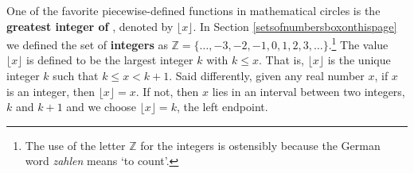 One of the favorite piecewise-defined functions in mathematical circles is the  \textbf{greatest integer of }, denoted by $\lfloor x \rfloor$. In Section \ref{setsofnumbersboxonthispage} we defined the set of \textbf{integers} as  $\mathbb{Z} = \{ \ldots, -3, -2, -1, 0, 1, 2, 3, \ldots\}$.\footnote{The use of the letter $\mathbb{Z}$ for the integers is ostensibly because the German word \textit{zahlen} means `to count'.}  The value $\lfloor x \rfloor$  is defined to be the largest integer $k$ with $k \leq x$.  That is, $\lfloor x \rfloor$ is the unique integer $k$ such that $k \leq  x < k+1$.  Said differently, given any real number $x$, if $x$ is an integer, then  $\lfloor x \rfloor = x$.  If not, then $x$ lies in an interval between two integers, $k$ and $k+1$ and we choose  $\lfloor x \rfloor = k$, the left endpoint.

